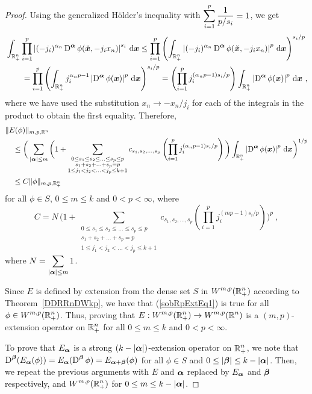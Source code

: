 \begin{proof}
Using the generalized Hölder's inequality with
$\displaystyle \sum_{i=1}^p \frac{1}{p/s_i} = 1$, we get
\begin{align*}
&\int_{\mathbb{R}^n_+} \prod_{i=1}^p \left| (-j_i)^{\alpha_n} \operatorname{D}^{{\bm{\alpha}}}
\phi(\breve{{\bm{x}}},-j_i x_n)\right|^{s_i} \,\mathrm{d}{{\bm{x}}}
\leq \prod_{i=1}^p \left( \int_{\mathbb{R}^n_+} \left| (-j_i)^{\alpha_n}
\operatorname{D}^{{\bm{\alpha}}}
\phi(\breve{{\bm{x}}},-j_i x_n)\right|^p \,\mathrm{d}{{\bm{x}}} \right)^{s_i/p} \\
&\qquad = \prod_{i=1}^p \left( \int_{\mathbb{R}^n_+} j_i^{\alpha_n p-1} \left|
 \operatorname{D}^{{\bm{\alpha}}} \phi({\bm{x}})\right|^p \,\mathrm{d}{{\bm{x}}} \right)^{s_i/p}
= \left( \prod_{i=1}^p j_i^{(\alpha_n p-1)s_i/p} \right) 
\int_{\mathbb{R}^n_+} \left| \operatorname{D}^{{\bm{\alpha}}} \phi({\bm{x}})\right|^p \,\mathrm{d}{{\bm{x}}} \ ,
\end{align*}
where we have used the substitution $x_n \to -x_n/j_i$ for each of the
integrals in the product to obtain the first equality.  Therefore,
\begin{align}
&\| E(\phi) \|_{m,p,\mathbb{R}^n} \nonumber \\
&\quad \leq \bigg( \sum_{|{\bm{\alpha}}|\leq m} \bigg( 1
+ \sum_{\substack{0\leq s_1 \leq s_2 \leq \ldots \leq s_p \leq p\\
  s_1+s_2+\ldots+s_p = p\\
  1\leq j_1 < j_2 < \ldots <j_p \leq k+1}} c_{s_1,s_2,\ldots,s_p}
\left( \prod_{i=1}^p j_i^{(\alpha_n p-1)s_i/p} \right) \bigg) 
\int_{\mathbb{R}^n_+} \left| \operatorname{D}^{{\bm{\alpha}}} \phi({\bm{x}}) \right|^p \,\mathrm{d}{{\bm{x}}}
  \bigg)^{1/p} \nonumber \\
&\quad \leq C \| \phi \|_{m,p,\mathbb{R}^n_+} \label{sobRpExtEq1}
\end{align}
for all $\phi \in S$, $0\leq m \leq k$ and $0<p<\infty$, where
\[
C = N\, \bigg(
1 + \sum_{\substack{0\leq s_1 \leq s_2 \leq \ldots \leq s_p \leq p\\
s_1+s_2+\ldots+s_p = p\\
1\leq j_1 < j_2 < \ldots <j_p \leq k+1}} c_{s_1,s_2,\ldots,s_p}
\left( \prod_{i=1}^p j_i^{(m p-1)s_i/p} \right) \bigg)^p \ ,
\]
where $\displaystyle N = \sum_{|{\bm{\alpha}}|\leq m} 1$.

Since $E$ is defined by extension from the dense set $S$ in
$\displaystyle W^{m,p}(\mathbb{R}^n_+)$ according to Theorem~\ref{DDRRnDWkp},
we have that (\ref{sobRpExtEq1}) is true for all
$\displaystyle \phi \in W^{m,p}(\mathbb{R}^n_+)$.  Thus, proving that
$\displaystyle E: W^{m,p}(\mathbb{R}^n_+) \to W^{m,p}(\mathbb{R}^n)$ is a $(m,p)$-extension
operator on $\displaystyle \mathbb{R}^n_+$ for all
$0\leq m \leq k$ and $0<p<\infty$.

To prove that $E_{{\bm{\alpha}}}$ is a strong
$(k-|{\bm{\alpha}}|)$-extension operator on $\displaystyle \mathbb{R}^n_+$, we note that
$\displaystyle \operatorname{D}^{{\bm{\beta}}} (E_{{\bm{\alpha}}}(\phi))
= E_{{\bm{\alpha}}}(\operatorname{D}^{{\bm{\beta}}} \phi)
= E_{{\bm{\alpha}}+{\bm{\beta}}}(\phi)$ for all
$\phi \in S$ and $0\leq |{\bm{\beta}}| \leq k - |{\bm{\alpha}}|$.  Then,
we repeat the previous arguments with $E$ and ${\bm{\alpha}}$ replaced
by $E_{{\bm{\alpha}}}$ and ${\bm{\beta}}$ respectively, and
$\displaystyle W^{m,p}(\mathbb{R}^n_+)$ for $0 \leq m \leq k-|{\bm{\alpha}}|$.
\end{proof}

